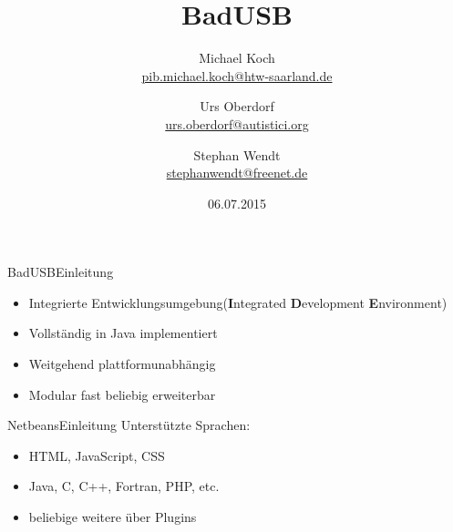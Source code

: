 \documentclass[xcolor=dvipsnames,pdftex]{beamer}
\title %
{BadUSB}
\author{Michael Koch\\
\href{mailto:pib.michael.koch@htw-saarland.de}{pib.michael.koch@htw-saarland.de}\\
\and{Urs Oberdorf\\
\href{mailto:urs.oberdorf@autistici.org}{urs.oberdorf@autistici.org}}\\
\and{Stephan Wendt\\
\href{mailto:stephanwendt@freenet.de}{stephanwendt@freenet.de}}}
\institute %
{
	Fakultät für Ingenieurwissenschaften\\
	Hochschule für Technik und Wirtschaft des Saarlandes
}
\date  %
{06.07.2015}
\begin{document}
\begin{frame}
	\titlepage
\end{frame}







\begin{frame}{BadUSB}{Einleitung}
	\begin{itemize}
		\item \glqq Integrierte Entwicklungsumgebung\grqq (\textbf{I}ntegrated \textbf{D}evelopment
			\textbf{E}nvironment)
			\pause
		\item Vollständig in Java implementiert
			\pause
		\item Weitgehend plattformunabhängig
			\pause
		\item Modular fast beliebig erweiterbar
	\end{itemize}
\end{frame}

\begin{frame}{Netbeans}{Einleitung}
	Unterstützte Sprachen:
	\bigskip
	\begin{itemize}
		\item HTML, JavaScript, CSS
			\pause
		\item Java, C, C++, Fortran, PHP, etc.
			\pause
		\item beliebige weitere über Plugins
	\end{itemize}
\end{frame}
\end{document}
